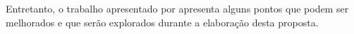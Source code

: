 Entretanto, o trabalho apresentado por  apresenta alguns pontos que podem ser melhorados e que serão explorados durante a elaboração desta proposta.








